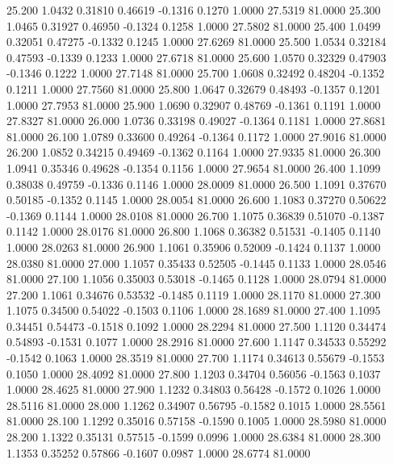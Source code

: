   25.200   1.0432   0.31810   0.46619  -0.1316   0.1270   1.0000  27.5319  81.0000
  25.300   1.0465   0.31927   0.46950  -0.1324   0.1258   1.0000  27.5802  81.0000
  25.400   1.0499   0.32051   0.47275  -0.1332   0.1245   1.0000  27.6269  81.0000
  25.500   1.0534   0.32184   0.47593  -0.1339   0.1233   1.0000  27.6718  81.0000
  25.600   1.0570   0.32329   0.47903  -0.1346   0.1222   1.0000  27.7148  81.0000
  25.700   1.0608   0.32492   0.48204  -0.1352   0.1211   1.0000  27.7560  81.0000
  25.800   1.0647   0.32679   0.48493  -0.1357   0.1201   1.0000  27.7953  81.0000
  25.900   1.0690   0.32907   0.48769  -0.1361   0.1191   1.0000  27.8327  81.0000
  26.000   1.0736   0.33198   0.49027  -0.1364   0.1181   1.0000  27.8681  81.0000
  26.100   1.0789   0.33600   0.49264  -0.1364   0.1172   1.0000  27.9016  81.0000
  26.200   1.0852   0.34215   0.49469  -0.1362   0.1164   1.0000  27.9335  81.0000
  26.300   1.0941   0.35346   0.49628  -0.1354   0.1156   1.0000  27.9654  81.0000
  26.400   1.1099   0.38038   0.49759  -0.1336   0.1146   1.0000  28.0009  81.0000
  26.500   1.1091   0.37670   0.50185  -0.1352   0.1145   1.0000  28.0054  81.0000
  26.600   1.1083   0.37270   0.50622  -0.1369   0.1144   1.0000  28.0108  81.0000
  26.700   1.1075   0.36839   0.51070  -0.1387   0.1142   1.0000  28.0176  81.0000
  26.800   1.1068   0.36382   0.51531  -0.1405   0.1140   1.0000  28.0263  81.0000
  26.900   1.1061   0.35906   0.52009  -0.1424   0.1137   1.0000  28.0380  81.0000
  27.000   1.1057   0.35433   0.52505  -0.1445   0.1133   1.0000  28.0546  81.0000
  27.100   1.1056   0.35003   0.53018  -0.1465   0.1128   1.0000  28.0794  81.0000
  27.200   1.1061   0.34676   0.53532  -0.1485   0.1119   1.0000  28.1170  81.0000
  27.300   1.1075   0.34500   0.54022  -0.1503   0.1106   1.0000  28.1689  81.0000
  27.400   1.1095   0.34451   0.54473  -0.1518   0.1092   1.0000  28.2294  81.0000
  27.500   1.1120   0.34474   0.54893  -0.1531   0.1077   1.0000  28.2916  81.0000
  27.600   1.1147   0.34533   0.55292  -0.1542   0.1063   1.0000  28.3519  81.0000
  27.700   1.1174   0.34613   0.55679  -0.1553   0.1050   1.0000  28.4092  81.0000
  27.800   1.1203   0.34704   0.56056  -0.1563   0.1037   1.0000  28.4625  81.0000
  27.900   1.1232   0.34803   0.56428  -0.1572   0.1026   1.0000  28.5116  81.0000
  28.000   1.1262   0.34907   0.56795  -0.1582   0.1015   1.0000  28.5561  81.0000
  28.100   1.1292   0.35016   0.57158  -0.1590   0.1005   1.0000  28.5980  81.0000
  28.200   1.1322   0.35131   0.57515  -0.1599   0.0996   1.0000  28.6384  81.0000
  28.300   1.1353   0.35252   0.57866  -0.1607   0.0987   1.0000  28.6774  81.0000
